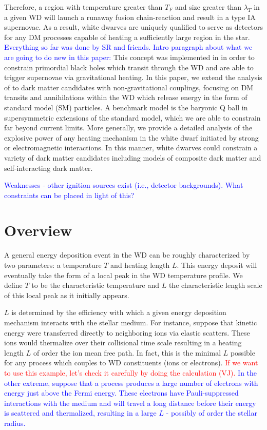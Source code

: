 \documentclass[twocolumn,showpacs,preprintnumbers,amsmath,amssymb,prl]{revtex4}
\begin{document}
Therefore, a region with temperature greater than $T_F$ and size greater than $\lambda_T$ in a given WD will launch a runaway fusion chain-reaction and result in a type IA supernovae. As a result, white dwarves are uniquely qualified to serve as detectors for any DM processes capable of heating a sufficiently large region in the star. \textcolor{blue}{Everything so far was done by SR and friends. Intro paragraph about what we are going to do new in this paper:} This concept was implemented in \cite{Graham:2015apa} in order to constrain primordial black holes which transit through the WD and are able to trigger supernovae via gravitational heating. In this paper, we extend the analysis of \cite{Graham:2015apa} to dark matter candidates with non-gravitational couplings, focusing on DM transits and annihilations within the WD which release energy in the form of standard model (SM) particles. A benchmark model is the baryonic Q ball in supersymmetric extensions of the standard model, which we are able to constrain far beyond current limits. More generally, we provide a detailed analysis of the explosive power of any heating mechanism in the white dwarf initiated by strong or electromagnetic interactions. In this manner, white dwarves could constrain a variety of dark matter candidates including models of composite dark matter and self-interacting dark matter.  

\textcolor{blue}{Weaknesses - other ignition sources exist (i.e., detector backgrounds). What constraints can be placed in light of this?}


\section{Overview}

A general energy deposition event in the WD can be roughly characterized by two parameters: a temperature $T$ and heating length $L$. This energy deposit will eventually take the form of a local peak in the WD temperature profile. We define $T$ to be the characteristic temperature and $L$ the characteristic length scale of this local peak as it initially appears.  

$L$ is determined by the efficiency with which a given energy deposition mechanism interacts with the stellar medium. For instance, suppose that kinetic energy were transferred directly to neighboring ions via elastic scatters. These ions would thermalize over their collisional time scale resulting in a heating length $L$ of order the ion mean free path. In fact, this is the minimal $L$ possible for any process which couples to WD constituents (ions or electrons). \textcolor{red}{If we want to use this example, let's check it carefully by doing the calculation (VJ).} \textcolor{blue}{In the other extreme, suppose that a process produces a large number of electrons with energy just above the Fermi energy.  These electrons have Pauli-suppressed interactions with the medium and will travel a long distance before their energy is scattered and thermalized, resulting in a large $L$ - possibly of order the stellar radius.}  
\end{document}
